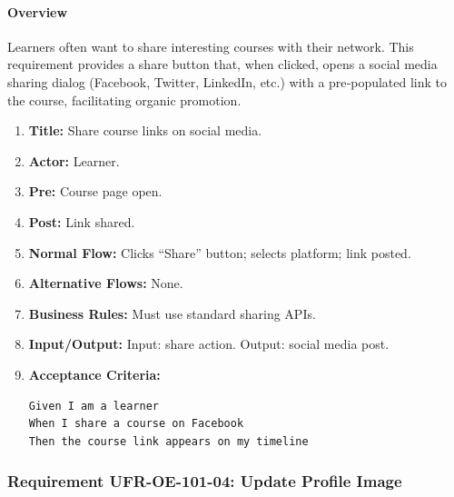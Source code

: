 \paragraph{Overview}
Learners often want to share interesting courses with their network. This requirement provides a share button that, when clicked, opens a social media sharing dialog (Facebook, Twitter, LinkedIn, etc.) with a pre‑populated link to the course, facilitating organic promotion.
\begin{enumerate}[label=\textbf{\arabic*.}]
\item \textbf{Title:} Share course links on social media.
\item \textbf{Actor:} Learner.
\item \textbf{Pre:} Course page open.
\item \textbf{Post:} Link shared.
\item \textbf{Normal Flow:} Clicks “Share” button; selects platform; link posted.
\item \textbf{Alternative Flows:} None.
\item \textbf{Business Rules:} Must use standard sharing APIs.
\item \textbf{Input/Output:} Input: share action. Output: social media post.
\item \textbf{Acceptance Criteria:}
    \begin{verbatim}
Given I am a learner
When I share a course on Facebook
Then the course link appears on my timeline
    \end{verbatim}
\end{enumerate}

\subsubsection{Requirement UFR-OE-101-04: Update Profile Image}
